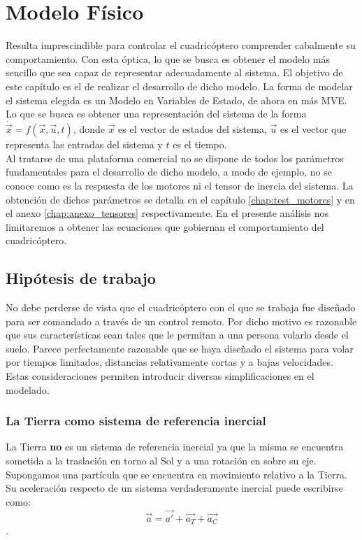 \documentclass[main]{subfiles}
\begin{document}
\chapter{Modelo F\'isico}
\label{chap:modelo}
Resulta imprescindible para controlar el cuadric\'optero comprender cabalmente su comportamiento. Con esta \'optica, lo que se busca es obtener el modelo m\'as sencillo que sea capaz de representar adecuadamente al sistema. El objetivo de este cap\'itulo es el de realizar el desarrollo de dicho modelo. La forma de modelar el sistema elegida es un Modelo en Variables de Estado, de ahora en m\'as MVE. Lo que se busca es obtener una representaci\'on del sistema de la forma $\dot{\vec{x}}=f\left(\vec{x},\vec{u},t\right)$, donde $\vec{x}$ es el vector de estados del sistema, $\vec{u}$ es el vector que representa las entradas del sistema y $t$ es el tiempo. \\

Al tratarse de una plataforma comercial no se dispone de todos los par\'ametros fundamentales para el desarrollo de dicho modelo, a modo de ejemplo, no se conoce como es la respuesta de los motores  ni el tensor de inercia del sistema. La obtenci\'on de dichos par\'ametros se detalla en el cap\'itulo \ref{chap:test_motores} y en el anexo \ref{chap:anexo_tensores} respectivamente. En el presente an\'alisis nos limitaremos a obtener las ecuaciones que gobiernan el comportamiento del cuadric\'optero.\\
    


\section{Hip\'otesis de trabajo}

No debe perderse de vista que el cuadric\'optero con el que se trabaja fue dise\~nado para ser comandado a trav\'es de un control remoto. Por dicho motivo es razonable que sus caracter\'isticas sean tales que le permitan a una persona volarlo desde el suelo. Parece perfectamente razonable que se haya dise\~nado el sistema para volar por tiempos limitados, distancias relativamente cortas y a bajas velocidades. Estas consideraciones permiten introducir diversas simplificaciones en el modelado.


\subsection{La Tierra como sistema de referencia inercial}
La Tierra {\bf no} es un sistema de referencia inercial ya que la misma se encuentra sometida a la traslaci\'on en torno al Sol y a una rotaci\'on en sobre su eje. Supongamos una part\'icula que se encuentra en movimiento relativo a la Tierra. Su aceleraci\'on respecto de un sistema verdaderamente inercial puede escribirse como:
\begin{equation}
\vec{a}=\vec{a\prime}+\vec{a_T} +\vec{a_C}
\end{equation}.
\end{document}
